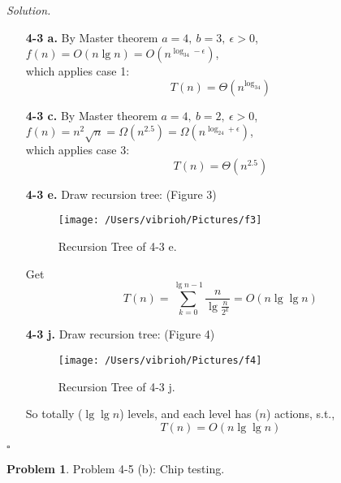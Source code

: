 \documentclass[11pt]{article}
\theoremstyle{definition}
\newtheorem{problem}{Problem}
\newenvironment{solution}{\noindent\emph{Solution.}}{\hfill$\square$}
\begin{document}
\begin{solution}
\begin{enumerate}
    \item[\textbf{4-3 a.}]
By Master theorem $a = 4, \ b=3, \ \epsilon > 0$, $f(n) = O(n\lg n) = O(n^{\log _34-\epsilon})$, 
\\which applies case 1:
$$T(n) = \Theta( n^{\log _34})$$

    \item[\textbf{4-3 c.}]
By Master theorem $a = 4, \ b=2, \ \epsilon > 0$, $f(n) = n^2 \sqrt{n} = \Omega( n^{2.5}) =  \Omega(n^{\log _24+\epsilon})$, \\
which applies case 3:
$$T(n) = \Theta(n^{2.5})$$

\item[\textbf{4-3 e.}]
Draw recursion tree: (Figure 3)
    \begin{figure}[htbp]
  \centering
  \texttt{[image: /Users/vibrioh/Pictures/f3]}
  \caption{Recursion Tree of 4-3 e.}
  \label{fig:shapes}
\end{figure}

Get $$T(n) = \sum_{k=0}^{\lg n-1}\frac{n}{\lg \frac{n}{2^k}} = O(n\lg \lg n) $$

\item[\textbf{4-3 j.}]
Draw recursion tree: (Figure 4)
    \begin{figure}[htbp]
  \centering
  \texttt{[image: /Users/vibrioh/Pictures/f4]}
  \caption{Recursion Tree of 4-3 j.}
  \label{fig:shapes}
\end{figure}

So totally ($\lg \lg n $) levels, and each level has ($n$) actions, s.t., $$T(n) =  O(n\lg \lg n) $$ 
  \end{enumerate}
\end{solution}

\clearpage






\begin{problem}
Problem 4-5 (b): Chip testing.
\end{problem}
\end{document}
